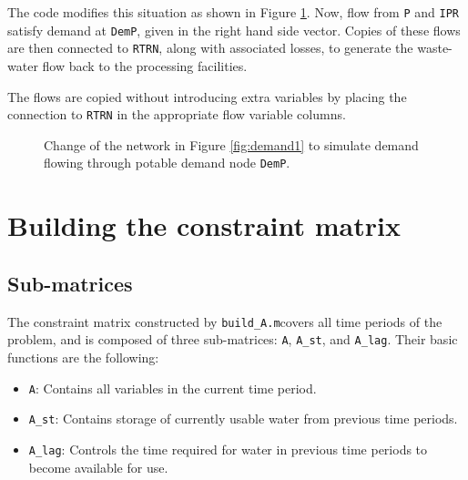 \documentclass[11pt]{article}
\newcommand{\buildA}{\texttt{build\_A.m}}
\newcommand{\A}{\texttt{A}}
\newcommand{\Ast}{\texttt{A\_st}}
\newcommand{\Alag}{\texttt{A\_lag}}
\begin{document}
The code modifies this situation as shown in Figure \ref{fig:demand2}.
Now, flow from \texttt{P} and \texttt{IPR} satisfy demand at \texttt{DemP}, given in the right hand side vector.
Copies of these flows are then connected to \texttt{RTRN}, along with associated losses, to generate the waste-water flow back to the processing facilities.

The flows are copied without introducing extra variables by placing the connection to \texttt{RTRN} in the appropriate flow variable columns.

\begin{figure}[ht]
	\centering
	\caption{
		Change of the network in Figure \ref{fig:demand1} to simulate demand flowing through potable demand node \texttt{DemP}.
	}
	\label{fig:demand2}
\end{figure}

\section{Building the constraint matrix}
\label{sec:A}

\subsection{Sub-matrices}
\label{ssec:submatrices}

The constraint matrix constructed by \buildA covers all time periods of the problem, and is composed of three sub-matrices: \A, \Ast, and \Alag.
Their basic functions are the following:
\begin{itemize}
	\item \A: Contains all variables in the current time period.
	\item \Ast: Contains storage of currently usable water from previous time periods.
	\item \Alag: Controls the time required for water in previous time periods to become available for use.
\end{itemize}
\end{document}
